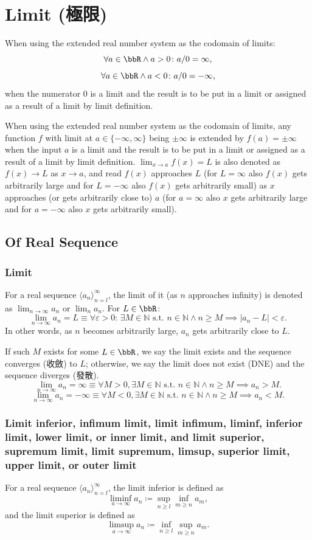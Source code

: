 \section{Limit (極限)}
When using the extended real number system as the codomain of limits:
\[\forall a\in\bbR\land a>0\colon a/0=\infty,\]
\[\forall a\in\bbR\land a<0\colon a/0=-\infty,\]
when the numerator $0$ is a limit and the result is to be put in a limit or assigned as a result of a limit by limit definition.

When using the extended real number system as the codomain of limits, any function $f$ with limit at $a\in\{-\infty,\infty\}$ being $\pm\infty$ is extended by $f(a)=\pm\infty$ when the input $a$ is a limit and the result is to be put in a limit or assigned as a result of a limit by limit definition.
$\lim_{x\to a}f(x)=L$ is also denoted as $f(x)\to L$ as $x\to a$, and read $f(x)$ approaches $L$ (for $L=\infty$ also $f(x)$ gets arbitrarily large and for $L=-\infty$ also $f(x)$ gets arbitrarily small) as $x$ approaches (or gets arbitrarily close to) $a$ (for $a=\infty$ also $x$ gets arbitrarily large and for $a=-\infty$ also $x$ gets arbitrarily small).
\subsection{Of Real Sequence}
\subsubsection{Limit}
For a real sequence \(\langle a_n\rangle_{n=l}^{\infty}\), the limit of it (as $n$ approaches infinity) is denoted as $\lim_{n \to \infty} a_n$ or $\lim_n a_n$. For $L\in\bbR$:
\[\lim_{n \to \infty} a_n = L \equiv \forall \varepsilon > 0:\, \exists M \in\mathbb{N}\text{\ s.t.\ } n\in\mathbb{N}\land n \geq M\implies |a_n - L| < \varepsilon.\]
In other words, as \(n\) becomes arbitrarily large, \(a_n\) gets arbitrarily close to \(L\).

If such $M$ exists for some $L\in\bbR$, we say the limit exists and the sequence converges (收斂) to $L$; otherwise, we say the limit does not exist (DNE) and the sequence diverges (發散).
\[\lim_{n\to \infty}a_n=\infty \equiv \forall M > 0, \exists M \in\mathbb{N} \text{\ s.t.\ } n\in\mathbb{N}\land n \geq M \implies a_n > M.\]
\[\lim_{n\to \infty}a_n=-\infty \equiv \forall M < 0, \exists M \in\mathbb{N} \text{\ s.t.\ } n\in\mathbb{N}\land n \geq M \implies a_n < M.\]
\subsubsection{Limit inferior, infimum limit, limit infimum, liminf, inferior limit, lower limit, or inner limit, and limit superior, supremum limit, limit supremum, limsup, superior limit, upper limit, or outer limit}
For a real sequence \(\langle a_n\rangle_{n=l}^{\infty}\), the limit inferior is defined as
\[\liminf_{a\to\infty}a_n\coloneq\sup_{n\geq l}\inf_{m\geq n}a_m,\]
and the limit superior is defined as
\[\limsup_{a\to\infty}a_n\coloneq\inf_{n\geq l}\sup_{m\geq n}a_m.\]
